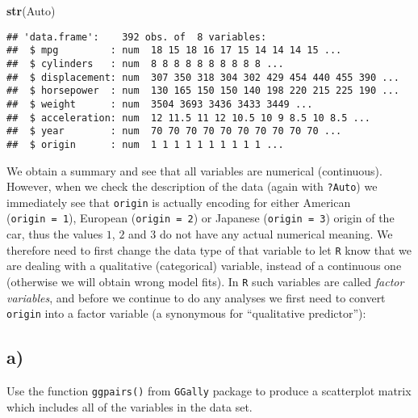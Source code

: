\documentclass[
]{article}
\newenvironment{Shaded}{\begin{snugshade}}{\end{snugshade}}
\newcommand{\FunctionTok}[1]{\textcolor[rgb]{0.13,0.29,0.53}{\textbf{#1}}}
\newcommand{\NormalTok}[1]{#1}
\newcommand{\OtherTok}[1]{\textcolor[rgb]{0.56,0.35,0.01}{#1}}
\newcommand{\SpecialCharTok}[1]{\textcolor[rgb]{0.81,0.36,0.00}{\textbf{#1}}}
\begin{document}
\begin{Shaded}
\begin{Highlighting}[]
\FunctionTok{str}\NormalTok{(Auto)}
\end{Highlighting}
\end{Shaded}

\begin{verbatim}
## 'data.frame':    392 obs. of  8 variables:
##  $ mpg         : num  18 15 18 16 17 15 14 14 14 15 ...
##  $ cylinders   : num  8 8 8 8 8 8 8 8 8 8 ...
##  $ displacement: num  307 350 318 304 302 429 454 440 455 390 ...
##  $ horsepower  : num  130 165 150 150 140 198 220 215 225 190 ...
##  $ weight      : num  3504 3693 3436 3433 3449 ...
##  $ acceleration: num  12 11.5 11 12 10.5 10 9 8.5 10 8.5 ...
##  $ year        : num  70 70 70 70 70 70 70 70 70 70 ...
##  $ origin      : num  1 1 1 1 1 1 1 1 1 1 ...
\end{verbatim}

We obtain a summary and see that all variables are numerical
(continuous). However, when we check the description of the data (again
with \texttt{?Auto}) we immediately see that \texttt{origin} is actually
encoding for either American (\texttt{origin\ =\ 1}), European
(\texttt{origin\ =\ 2}) or Japanese (\texttt{origin\ =\ 3}) origin of
the car, thus the values \(1\), \(2\) and \(3\) do not have any actual
numerical meaning. We therefore need to first change the data type of
that variable to let \texttt{R} know that we are dealing with a
qualitative (categorical) variable, instead of a continuous one
(otherwise we will obtain wrong model fits). In \texttt{R} such
variables are called \emph{factor variables}, and before we continue to
do any analyses we first need to convert \texttt{origin} into a factor
variable (a synonymous for ``qualitative predictor''):

\begin{Shaded}
\end{Shaded}

\subsection{a)}\label{a}

Use the function \texttt{ggpairs()} from \texttt{GGally} package to
produce a scatterplot matrix which includes all of the variables in the
data set.
\end{document}
